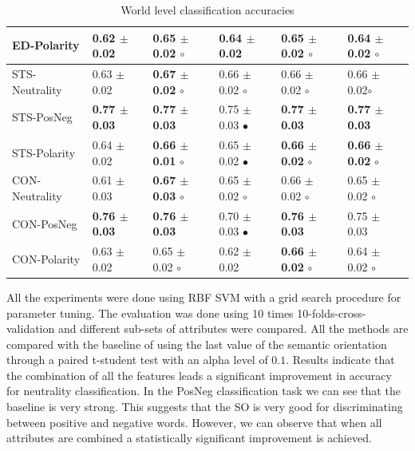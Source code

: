 \documentclass{sig-alternate}
\begin{document}
\begin{table}[htbp]
\begin{center}
\begin{tabular}{|l|l|l|l|l|l|}
ED-Polarity & 0.62 $\pm$ 0.02 &  \textbf{0.65 $\pm$0.02} $\circ$ & 0.64 $\pm$ 0.02 & \textbf{0.65 $\pm$ 0.02} $\circ$ & 0.64 $\pm$ 0.02 $\circ$ \\ \hline
STS-Neutrality & 0.63 $\pm$ 0.02 & \textbf{0.67 $\pm$ 0.02} $\circ$             & 0.66 $\pm$ 0.02 $\circ$  & 0.66 $\pm$ 0.02 $\circ$ & 0.66 $\pm$ 0.02$\circ$ \\ 
STS-PosNeg & \textbf{0.77 $\pm$ 0.03} &  \textbf{0.77 $\pm$ 0.03} & 0.75 $\pm$ 0.03 $\bullet$ & \textbf{0.77 $\pm$ 0.03} & \textbf{0.77 $\pm$ 0.03} \\ 
STS-Polarity & 0.64 $\pm$ 0.02 & \textbf{0.66 $\pm$ 0.01} $\circ$  & 0.65 $\pm$ 0.02 $\bullet$  & \textbf{0.66 $\pm$ 0.02} $\circ$ & \textbf{0.66 $\pm$ 0.02} $\circ$ \\ \hline
CON-Neutrality & 0.61 $\pm$ 0.03 & \textbf{0.67 $\pm$ 0.03}  $\circ$ & 0.65 $\pm$ 0.02 $\circ$ & 0.66 $\pm$ 0.02  $\circ$ & 0.65 $\pm$ 0.02 $\circ$ \\ 
CON-PosNeg & \textbf{0.76 $\pm$ 0.03} & \textbf{0.76 $\pm$ 0.03} & 0.70 $\pm$ 0.03 $\bullet$ & \textbf{0.76 $\pm$ 0.03} & 0.75 $\pm$ 0.03 \\ 
CON-Polarity & 0.63 $\pm$ 0.02 & 0.65 $\pm$ 0.02 $\circ$ & 0.62 $\pm$ 0.02  & \textbf{0.66 $\pm$ 0.02}  $\circ$ & 0.64 $\pm$ 0.02 $\circ$ \\ \hline
\end{tabular}
\caption{World level classification accuracies} 
\end{center}
\label{}
\end{table}







All the experiments were done using RBF SVM with a grid search procedure for parameter tuning. The evaluation was done using 10 times 10-folds-cross-validation and different sub-sets of attributes were compared.  All the methods are compared with the baseline of using the last value of the semantic orientation through a paired t-student test with an alpha level of $0.1$.   
Results indicate that the combination of all the features leads a significant improvement in accuracy for neutrality classification.  In the PosNeg classification task we can see that the baseline is very strong. This suggests that the SO is very good for discriminating between positive and negative words. However, we can observe that when all attributes are combined a statistically significant improvement is achieved.
\end{document}
